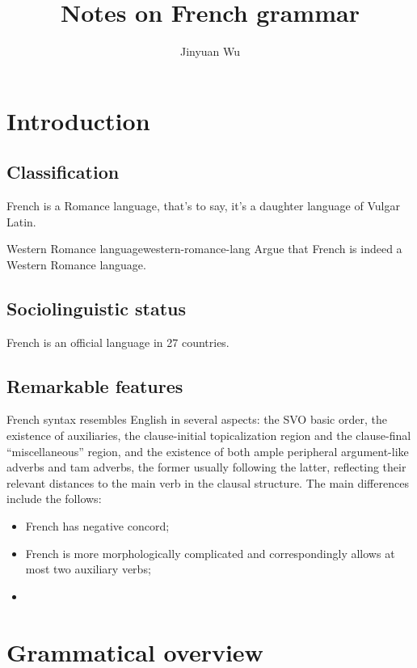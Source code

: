 \documentclass[a4paper, oneside, 12pt]{report}
\title{Notes on French grammar}
\author{Jinyuan Wu}
\begin{document}
\automath

\maketitle

\chapter{Introduction}

\section{Classification}

French is a Romance language, that's to say, it's a daughter language of Vulgar Latin.

\begin{todobox}{Western Romance language}{western-romance-lang}
    Argue that French is indeed a Western Romance language.
\end{todobox}

\section{Sociolinguistic status}

French is an official language in 27 countries.


\section{Remarkable features}

French syntax resembles English in several aspects:
the SVO basic order,
the existence of auxiliaries, 
the clause-initial topicalization region and 
the clause-final ``miscellaneous'' region, 
and the existence of both ample peripheral argument-like adverbs 
and \ac{tam} adverbs, 
the former usually following the latter, 
reflecting their relevant distances to the main verb in the clausal structure.
The main differences include the follows:
\begin{itemize}
    \item French has negative concord;
    \item French is more morphologically complicated 
    and correspondingly allows at most two auxiliary verbs;
    \item 
\end{itemize}

\chapter{Grammatical overview}
\end{document}
